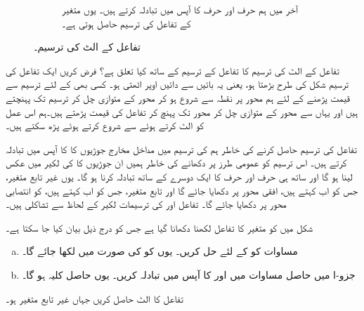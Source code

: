 \begin{figure}
\begin{subfigure}{0.45\textwidth}
\caption{
آخر میں ہم حرف  اور حرف  کا آپس میں تبادلہ  کرتے ہیں۔ یوں متغیر  کے تفاعل  کی ترسیم حاصل ہوتی ہے۔ 
}
\end{subfigure}
\caption{تفاعل  کے الٹ  کی ترسیم۔}
\label{شکل_ماورائی_تفاعل_کے_الٹ-کی_ترسیم}
\end{figure}
تفاعل کے الٹ کی ترسیم کا تفاعل کے ترسیم کے ساتھ کیا تعلق ہے؟ فرض کریں ایک تفاعل کی ترسیم شکل کی طرح  بڑھتا ہو، یعنی یہ بائیں سے دائیں اوپر اٹھتی  ہو۔ کسی بھی  کے لئے ترسیم سے قیمت پڑھنے کے لئے ہم محور  پر نقطہ  سے شروع ہو کر محور  کے متوازی چل کر ترسیم تک پہنچتے ہیں اور یہاں سے محور  کے متوازی چل کر محور  تک پہنچ کر تفاعل کی قیمت  پڑھتے ہیں۔ہم اس عمل کو الٹ کرتے ہوئے  سے شروع کرتے ہوئے  پڑھ سکتے ہیں۔

تفاعل  کی ترسیم حاصل کرنے کی خاطر ہم  کی ترسیم میں مداخل مخارج جوڑیوں کا  کا آپس میں تبادلہ  کرتے ہیں۔ اس ترسیم کو عمومی طرز پر دکھانے کی خاطر ہمیں ان جوڑیوں کا  کی لکیر  میں عکس لینا ہو گا اور ساتھ ہی  حرف  اور حرف  کا ایک دوسرے کے ساتھ تبادلہ کرنا ہو گا۔ یوں غیر تابع متغیر، جس کو اب  کہتے ہیں، افقی محور پر دکھایا جائے گا اور تابع متغیر، جس کو اب  کہتے ہیں، کو انتصابی محور پر دکھایا جائے گا۔ تفاعل  اور  کی ترسیمات لکیر  کے لحاظ سے تشاکلی ہیں۔

شکل  میں  کو متغیر  کا تفاعل لکھنا دکھانا گیا ہے جس کو درج ذیل بیان کیا جا سکتا ہے۔
\begin{enumerate}[a.]
\item
مساوات  کو   کے لئے حل کریں۔ یوں  کو  کی صورت میں لکھا جائے گا۔
\item
جزو-ا میں حاصل مساوات میں  اور  کا آپس میں تبادلہ کریں۔ یوں حاصل کلیہ  ہو گا۔
\end{enumerate} 

تفاعل  کا الٹ حاصل کریں جہاں غیر تابع متغیر  ہو۔

